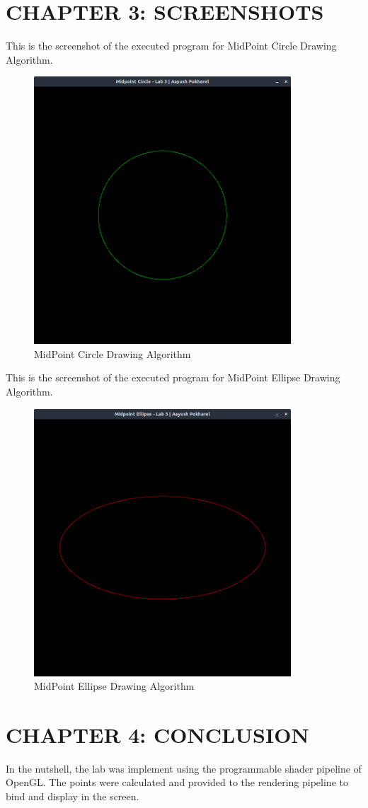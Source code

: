 \documentclass[12pt]{article}
\begin{document}
\section{CHAPTER 3: SCREENSHOTS}
This is the screenshot of the executed program for MidPoint Circle Drawing Algorithm.
\begin{figure}[h]
    \centerline{\includegraphics[height=100mm]{MidPointCircle.png}}
    \caption{MidPoint Circle Drawing Algorithm}
    \label{fig}
\end{figure}
\clearpage
This is the screenshot of the executed program for MidPoint Ellipse Drawing Algorithm.
\begin{figure}[ h ]
    \centerline{\includegraphics[height=100mm]{MidPointEllipse.png}}
    \caption{MidPoint Ellipse Drawing Algorithm}
    \label{fig}
\end{figure}

\section{CHAPTER 4: CONCLUSION}
In the nutshell, the lab was implement using the programmable shader pipeline of OpenGL. The points were calculated and provided to the rendering pipeline to
bind and display in the screen.
\clearpage
\thispagestyle{empty}
\printbibliography
\end{document}
